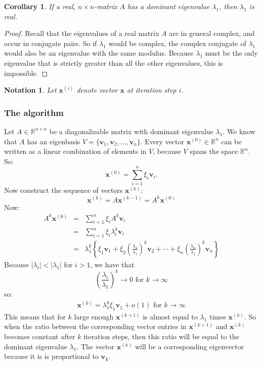 \documentclass[a4paper,11pt]{report}
\newtheorem{corollary}[theorem]{Corollary}
\newtheorem{notation}[theorem]{Notation}
\newcommand{\R}{{\mathbb R}}
\begin{document}
\begin{corollary}\label{reallambda1}
  If a real, $n\times n$-matrix $A$ has a dominant eigenvalue $\lambda_1$, then $\lambda_1$ is real.
\end{corollary}
\begin{proof}
  Recall that the eigenvalues of a real matrix $A$ are in general complex, and occur in conjugate pairs. So if $\lambda_1$ would be
   complex, the complex conjugate of $\lambda_1$ 
  would also be an eigenvalue with the same modulus. Because $\lambda_1$ must be 
  the only eigenvalue that is strictly greater than all the other eigenvalues, 
  this is impossible.
  \end{proof}



\begin{notation}\label{numeriekenotatie}
  Let $\mathbf{x}^{(i)}$ denote vector $\mathbf{x}$ at iteration step $i$.
\end{notation}
\subsubsection{The algorithm}
Let $A \in \R^{n\times n}$ be a diagonalizable matrix with dominant eigenvalue $\lambda_1$.
We know that $A$ has an eigenbasis $V=\{\mathbf{v}_1, \mathbf{v}_2,\ldots,\mathbf{v}_n\}$. Every vector
$\mathbf{x}^{(0)} \in \R^n$ can be written as a linear combination of elements in 
$V$, because $V$ spans the space $\R^n$. So:
$$\mathbf{x}^{(0)} = \sum_{i=1}^n \xi_i \mathbf{v}_i.$$
Now construct the sequence of vectors $\mathbf{x}^{(k)}$:
$$\mathbf{x}^{(k)} = A\mathbf{x}^{(k-1)} = A^k\mathbf{x}^{(0)}$$
Now:
\begin{eqnarray*}
  A^k\mathbf{x}^{(0)} &=& \sum^n_{i=1}\xi_i A^k \mathbf{v}_i\\
  &=& \sum^n_{i=1}\xi_i \lambda_i^k \mathbf{v}_i\\
  &=& \lambda_1^k \left\{\xi_1 \mathbf{v}_1 + \xi_2\left(\frac{\lambda_2}{\lambda_1}\right)^k \mathbf{v}_2 + \cdots +
  \xi_n\left(\frac{\lambda_n}{\lambda_1}\right)^k \mathbf{v}_n \right\}
\end{eqnarray*}
Because $|\lambda_i| < |\lambda_1|$ for $i > 1 $, we have that 
$$\left(\frac{\lambda_i}{\lambda_1}\right)^k \to 0 \text{ for } k \to \infty$$
so:
\begin{eqnarray}\label{tijdscomplexiteit}
  \mathbf{x}^{(k)} = \lambda_1^k \xi_1\mathbf{v}_1 + o(1) \text{ for } k \to \infty
\end{eqnarray}
This means that for $k$ large enough $\mathbf{x}^{(k+1)}$ is almost equal to $\lambda_1$ times $\mathbf{x}^{(k)}$. So when 
the ratio 
between the corresponding
vector entries in $\mathbf{x}^{(k+1)}$ and $\mathbf{x}^{(k)}$ becomes constant 
after $k$ iteration steps, then this ratio will be equal to the dominant eigenvalue 
$\lambda_1$. The vector $\mathbf{x}^{(k)}$ will be a corresponding eigenvector because it is is 
proportional to $\mathbf{v_1}$. 
\end{document}
